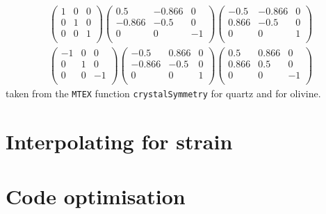 \documentclass[a4paper,12pt,twoside]{report}
\numberwithin{equation}{chapter}
\begin{document}
\begin{equation}
\begin{multlined}
\begin{pmatrix}
1 & 0 & 0 \\
0 & 1 & 0 \\
0 & 0 & 1 \\
\end{pmatrix}
\begin{pmatrix}
0.5    & -0.866 & 0 \\
-0.866 & -0.5   & 0 \\
0      & 0      & -1 \\
\end{pmatrix}
\begin{pmatrix}
-0.5    & -0.866 & 0 \\
0.866  & -0.5   & 0 \\
0      & 0      & 1 \\
\end{pmatrix}
\\
\begin{pmatrix}
-1 & 0 &  0 \\
0  & 1 &  0 \\
0  & 0 & -1 \\
\end{pmatrix}
\begin{pmatrix}
-0.5    & 0.866 & 0 \\
-0.866  & -0.5   & 0 \\
0      & 0      & 1 \\
\end{pmatrix}
\begin{pmatrix}
0.5    & 0.866 & 0 \\
0.866  & 0.5   & 0 \\
0      & 0      & -1 \\
\end{pmatrix}
\end{multlined}
\end{equation}
\noindent
taken from the \texttt{MTEX} function \texttt{crystalSymmetry} for quartz and \cite{Randle2000} for olivine.

\section{Interpolating for strain} \label{App:strain}


\section{Code optimisation} \label{App:optimisation}
\end{document}
